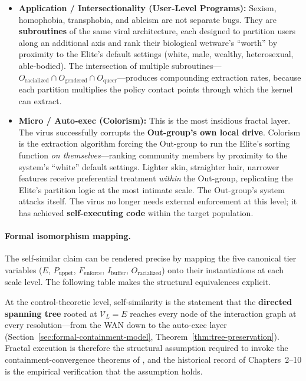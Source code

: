 \begin{itemize}
    \item \textbf{Application / Intersectionality (User-Level Programs):} Sexism, homophobia, transphobia, and ableism are not separate bugs. They are \textbf{subroutines} of the same viral architecture, each designed to partition users along an additional axis and rank their biological wetware's ``worth'' by proximity to the Elite's default settings (white, male, wealthy, heterosexual, able-bodied). The intersection of multiple subroutines---$O_{\text{racialized}} \cap O_{\text{gendered}} \cap O_{\text{queer}}$---produces compounding extraction rates, because each partition multiplies the policy contact points through which the kernel can extract.

    \item \textbf{Micro / Auto-exec (Colorism):} This is the most insidious fractal layer. The virus successfully corrupts the \textbf{Out-group's own local drive}. Colorism is the extraction algorithm forcing the Out-group to run the Elite's sorting function \textit{on themselves}---ranking community members by proximity to the system's ``white'' default settings. Lighter skin, straighter hair, narrower features receive preferential treatment \textit{within} the Out-group, replicating the Elite's partition logic at the most intimate scale. The Out-group's system attacks itself. The virus no longer needs external enforcement at this level; it has achieved \textbf{self-executing code} within the target population.
\end{itemize}

\paragraph{Formal isomorphism mapping.}
The self-similar claim can be rendered precise by mapping the five canonical tier variables ($E$, $P_{\text{uppet}}$, $F_{\text{enforce}}$, $I_{\text{buffer}}$, $O_{\text{racialized}}$) onto their instantiations at each scale level. The following table makes the structural equivalences explicit.

At the control-theoretic level, self-similarity is the statement that the \textbf{directed spanning tree} rooted at $\mathcal{V}_L = E$ reaches every node of the interaction graph at every resolution---from the WAN down to the auto-exec layer (Section~\ref{sec:formal-containment-model}, Theorem~\ref{thm:tree-preservation}). Fractal execution is therefore the structural assumption required to invoke the containment-convergence theorems of \cite{kan_containment}, and the historical record of Chapters~2--10 is the empirical verification that the assumption holds.

